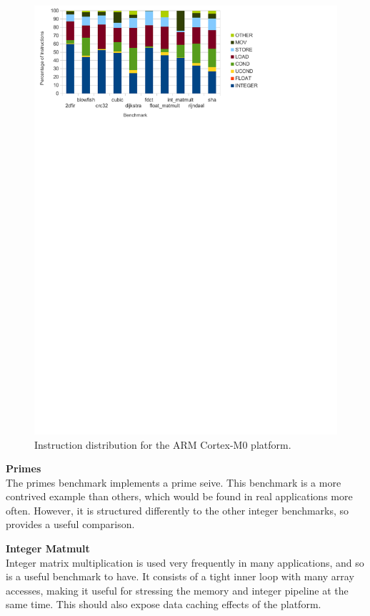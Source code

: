 \documentclass[twocolumn]{article}
\begin{document}
\begin{figure}[t]
	\includegraphics[width=\linewidth,clip, trim=0 8.5in 2in 0]{xmos.pdf}
	\caption{Instruction distribution for the ARM Cortex-M0 platform.}
	\label{Fig:InstructionDistributionARM}
\end{figure}

\vspace{3mm}
\textbf{Primes}\\
The primes benchmark implements a prime seive. This benchmark is a more contrived example than others, which would be found in real applications more often. However, it is structured differently to the other integer benchmarks, so provides a useful comparison.

\vspace{3mm}
\textbf{Integer Matmult}\\
Integer matrix multiplication is used very frequently in many applications, and so is a useful benchmark to have. It consists of a tight inner loop with many array accesses, making it useful for stressing the memory and integer pipeline at the same time. This should also expose data caching effects of the platform.
\end{document}
